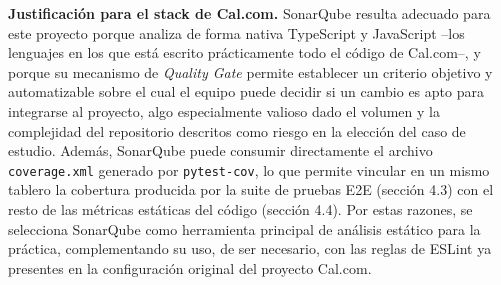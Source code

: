 \documentclass{article}
\begin{document}
\begin{table}[h]
\centering
{}
\caption{Comparativa de herramientas de análisis estático de código. Fuente: elaboración propia con base en Khorikov (2020), Aniche (2022) y documentación oficial (docs.sonarsource.com, eslint.org, semgrep.dev).}
\label{tab:static}
\end{table}

\textbf{Justificación para el stack de Cal.com.} SonarQube resulta
adecuado para este proyecto porque analiza de forma nativa
TypeScript y JavaScript --los lenguajes en los que está escrito
prácticamente todo el código de Cal.com--, y porque su mecanismo de
\emph{Quality Gate} permite establecer un criterio objetivo y
automatizable sobre el cual el equipo puede decidir si un cambio es
apto para integrarse al proyecto, algo especialmente valioso dado el
volumen y la complejidad del repositorio descritos como riesgo en la
elección del caso de estudio. Además, SonarQube puede consumir
directamente el archivo \texttt{coverage.xml} generado por
\texttt{pytest-cov}, lo que permite vincular en un mismo tablero la
cobertura producida por la suite de pruebas E2E (sección 4.3) con el
resto de las métricas estáticas del código (sección 4.4). Por estas
razones, se selecciona SonarQube como herramienta principal de
análisis estático para la práctica, complementando su uso, de ser
necesario, con las reglas de ESLint ya presentes en la configuración
original del proyecto Cal.com.
\end{document}
